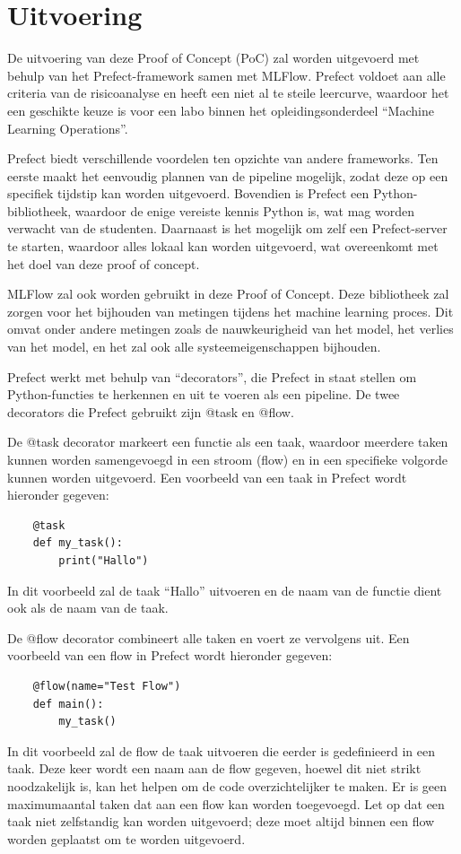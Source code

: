 \section{Uitvoering}
De uitvoering van deze Proof of Concept (PoC) zal worden uitgevoerd met behulp van het Prefect-framework samen met MLFlow. Prefect voldoet aan alle criteria van de risicoanalyse en heeft een niet al te steile leercurve, waardoor het een geschikte keuze is voor een labo binnen het opleidingsonderdeel ``Machine Learning Operations''.

Prefect biedt verschillende voordelen ten opzichte van andere frameworks. Ten eerste maakt het eenvoudig plannen van de pipeline mogelijk, zodat deze op een specifiek tijdstip kan worden uitgevoerd. Bovendien is Prefect een Python-bibliotheek, waardoor de enige vereiste kennis Python is, wat mag worden verwacht van de studenten. Daarnaast is het mogelijk om zelf een Prefect-server te starten, waardoor alles lokaal kan worden uitgevoerd, wat overeenkomt met het doel van deze proof of concept.

MLFlow zal ook worden gebruikt in deze Proof of Concept. Deze bibliotheek zal zorgen voor het bijhouden van metingen tijdens het machine learning proces. Dit omvat onder andere metingen zoals de nauwkeurigheid van het model, het verlies van het model, en het zal ook alle systeemeigenschappen bijhouden.

Prefect werkt met behulp van ``decorators'', die Prefect in staat stellen om Python-functies te herkennen en uit te voeren als een pipeline. De twee decorators die Prefect gebruikt zijn @task en @flow.

De @task decorator markeert een functie als een taak, waardoor meerdere taken kunnen worden samengevoegd in een stroom (flow) en in een specifieke volgorde kunnen worden uitgevoerd. Een voorbeeld van een taak in Prefect wordt hieronder gegeven:
\begin{verbatim}
    @task
    def my_task():
        print("Hallo")
\end{verbatim}

In dit voorbeeld zal de taak ``Hallo'' uitvoeren en de naam van de functie dient ook als de naam van de taak.

De @flow decorator combineert alle taken en voert ze vervolgens uit. Een voorbeeld van een flow in Prefect wordt hieronder gegeven:
\begin{verbatim}
    @flow(name="Test Flow")
    def main():
        my_task()
\end{verbatim}
In dit voorbeeld zal de flow de taak uitvoeren die eerder is gedefinieerd in een taak. Deze keer wordt een naam aan de flow gegeven, hoewel dit niet strikt noodzakelijk is, kan het helpen om de code overzichtelijker te maken. Er is geen maximumaantal taken dat aan een flow kan worden toegevoegd. Let op dat een taak niet zelfstandig kan worden uitgevoerd; deze moet altijd binnen een flow worden geplaatst om te worden uitgevoerd.\\

